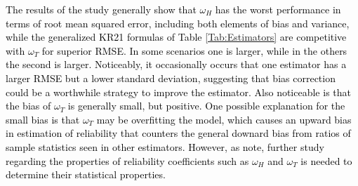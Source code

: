 \documentclass[12pt,epsfig]{article}
\newcommand{\changed}[1]{\textcolor{black}{#1}}
\begin{document}
\changed{The results of the study generally show that $\omega_{H}$ has the worst performance in terms of root mean squared error, including both elements of bias and variance, while the generalized KR21 formulas of Table \ref{Tab:Estimators} are competitive with $\omega_{T}$ for superior RMSE. In some scenarios one is larger, while in the others the second is larger. Noticeably, it occasionally occurs that one estimator has a larger RMSE but a lower standard deviation, suggesting that bias correction could be a worthwhile strategy to improve the estimator. Also noticeable is that the bias of $\omega_{T}$ is generally small, but positive. One possible explanation for the small bias is that $\omega_{T}$ may be overfitting the model, which causes an upward bias in estimation of reliability that counters the general downard bias from ratios of sample statistics seen in other estimators. However, as \cite{Savalei2019} note, further study regarding the properties of reliability coefficients such as $\omega_H$ and $\omega_{T}$ is needed to determine their statistical properties.}
\end{document}
